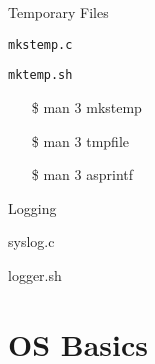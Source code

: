 \begin{frame}{Temporary Files}
  \begin{minipage}[t]{.55\linewidth}
    \begin{iblock}{\texttt{mkstemp.c}}
    \end{iblock}
  \end{minipage}\qquad
  \begin{minipage}[t]{.35\linewidth}
    \begin{iblock}{\texttt{mktemp.sh}}
    \end{iblock}
    \ttfamily
    \begin{itemize}
    \item[\$] man 3 mkstemp
    \item[\$] man 3 tmpfile
    \item[\$] man 3 asprintf
    \end{itemize}
  \end{minipage}
\end{frame}

\begin{frame}{Logging}
  \begin{iblock}{\ttfamily syslog.c}
    \begin{center}
    \end{center}
  \end{iblock}
  \begin{iblock}{\ttfamily logger.sh}
    \begin{center}
    \end{center}
  \end{iblock}
\end{frame}

\section{OS Basics}
\label{sec:os-basics}


